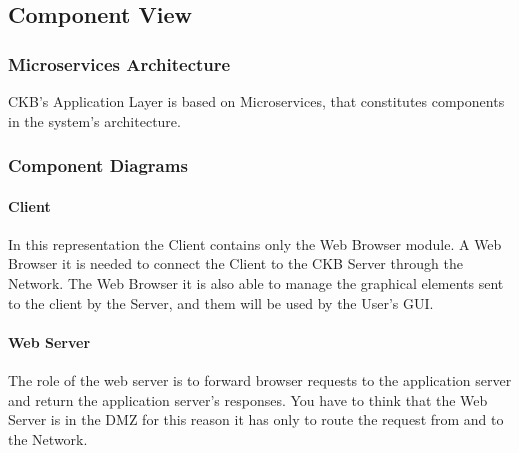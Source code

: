 \newpage

\subsection{Component View}
\subsubsection{Microservices Architecture}
CKB's Application Layer is based on Microservices, that constitutes components in the system's architecture.
\newpage
\subsubsection{Component Diagrams}
\newpage

\paragraph{Client}
In this representation the Client contains only the Web Browser module.
A Web Browser it is needed to connect the Client to the CKB Server through the Network. The Web Browser it is also able to manage the graphical elements sent to the client by the Server, and them will be used by the User's GUI.
\newpage

\paragraph{Web Server}
The role of the web server is to forward browser requests to the application server and return the application server's responses. You have to think that the Web Server is in the DMZ for this reason it has only to route the request
from and to the Network.
\newpage


